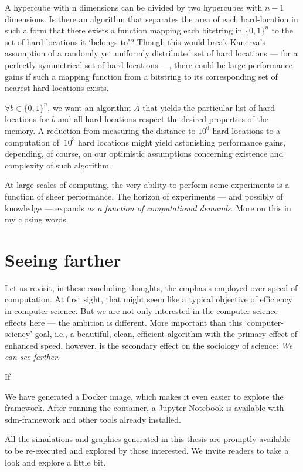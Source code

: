 A hypercube with n dimensions can be divided by two hypercubes with $n-1$ dimensions. Is there an algorithm that separates the area of each hard-location in such a form that there exists a function mapping each bitstring in $\{0,1\}^n$ to the set of hard locations it `belongs to'?  Though this would break Kanerva's assumption of a randomly yet uniformly distributed set of hard locations --- for a perfectly symmetrical set of hard locations ---, there could be large performance gains if such a mapping function from a bitstring to its corresponding set of nearest hard locations exists.

$\forall b \in \{ 0,1\} ^n$, we want an algorithm $A$ that yields the particular list of hard locations for $b$ and all hard locations respect the desired properties of the memory.  A reduction from measuring the distance to $10^6$ hard locations to a computation of $~ 10^3$ hard locations might yield astonishing performance gains, depending, of course, on our optimistic assumptions concerning existence and complexity of such algorithm.

At large scales of computing, the very ability to perform some experiments is a function of sheer performance. The horizon of experiments --- and possibly of knowledge --- expands \emph{as a function of computational demands}. More on this in my closing words.

\section{Seeing farther}

Let us revisit, in these concluding thoughts, the emphasis employed over speed of computation.  At first sight, that might seem like a typical objective of efficiency in computer science. But we are not only interested in the computer science effects here --- the ambition is different. More important than this `computer-sciency' goal, i.e., a beautiful, clean, efficient algorithm with the primary effect of enhanced speed, however, is the secondary effect on the sociology of science:  \emph{We can see farther}.

If

We have generated a Docker image, which makes it even easier to explore the framework. After running the container, a Jupyter Notebook is available with sdm-framework and other tools already installed.


All the simulations and graphics generated in this thesis are promptly available to be re-executed and explored by those interested. We invite readers to take a look and explore a little bit.

